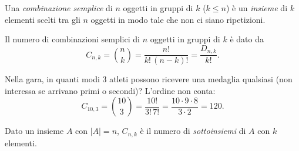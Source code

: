 \documentclass[11pt,a4paper]{article}
\begin{document}
\begin{definizione}
Una \emph{combinazione semplice} di $n$ oggetti in gruppi di $k$ ($k \leq n$) è un \emph{insieme} di $k$ elementi scelti tra gli $n$ oggetti in modo tale che non ci siano ripetizioni.
\end{definizione}

\begin{proposizione}
Il numero di combinazioni semplici di $n$ oggetti in gruppi di $k$ è dato da
\[
C_{n,k} = \binom{n}{k} = \frac{n!}{k!\,(n-k)!} = \frac{D_{n,k}}{k!} .
\]
\end{proposizione}

\begin{esempio}
Nella gara, in quanti modi $3$ atleti possono ricevere una medaglia qualsiasi (non interessa se arrivano primi o secondi)? L'ordine non conta:
\[
C_{10,3} = \binom{10}{3} = \frac{10!}{3!\,7!} = \frac{10 \cdot 9 \cdot 8}{3 \cdot 2} = 120 .
\]
\end{esempio}

\begin{osservazione}
Dato un insieme $A$ con $|A| = n$, $C_{n,k}$ è il numero di \emph{sottoinsiemi} di $A$ con $k$ elementi.
\end{osservazione}
\end{document}
